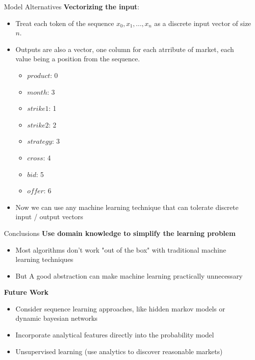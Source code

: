 \begin{frame}{Model Alternatives}
\textbf{Vectorizing the input}:
\begin{itemize}
 \item Treat each token of the sequence $x_0, x_1, ... , x_n$ as a discrete input vector of size $n$.
 \item Outputs are also a vector, one column for each atrribute of market, each value being a position from the sequence.
  \begin{itemize}
  	\item $product$: 0
    \item $month$: 3
    \item $strike1$: 1 
    \item $strike2$: 2
    \item $strategy$: 3
    \item $cross$: 4
    \item $bid$: 5
    \item $offer$: 6 
  \end{itemize}
\item Now we can use any machine learning technique that can tolerate discrete input / output vectors
\end{itemize}
\end{frame}

\begin{frame}{Conclusions}
\textbf{Use domain knowledge to simplify the learning problem}
\begin{itemize}
 \item Most algorithms don't work "out of the box" with traditional machine learning techniques 
 \pause
 \item But A good abstraction can make machine learning practically unnecessary
\end{itemize}
\textbf{Future Work}
\begin{itemize}
 \item Consider sequence learning approaches, like hidden markov models or dynamic bayesian networks
 \item Incorporate analytical features directly into the probability model
 \item Unsupervised learning (use analytics to discover reasonable markets)
\end{itemize}
\end{frame}